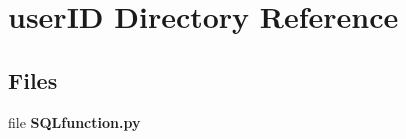 \section{user\+ID Directory Reference}
\label{dir_42c9f7fbc1bd05fcf8b47d3cd8ba2bb8}
\subsection*{Files}
\begin{DoxyCompactItemize}
\item 
file \textbf{ S\+Q\+Lfunction.\+py}
\end{DoxyCompactItemize}
